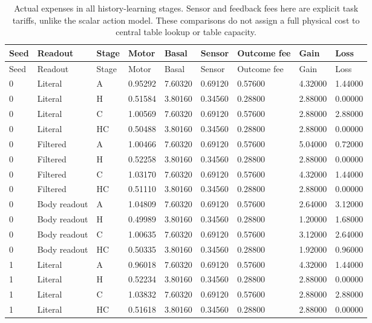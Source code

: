 \begin{longtable}{lllllllll}
\caption{Actual expenses in all history-learning stages. Sensor and feedback fees here are explicit task tariffs, unlike the scalar action model. These comparisons do not assign a full physical cost to central table lookup or table capacity.}\label{tab:history-costs}\\
\toprule
Seed & Readout & Stage & Motor & Basal & Sensor & Outcome fee & Gain & Loss \\
\midrule
\endfirsthead
\toprule
Seed & Readout & Stage & Motor & Basal & Sensor & Outcome fee & Gain & Loss \\
\midrule
\endhead
0 & Literal & A & 0.95292 & 7.60320 & 0.69120 & 0.57600 & 4.32000 & 1.44000 \\
0 & Literal & H & 0.51584 & 3.80160 & 0.34560 & 0.28800 & 2.88000 & 0.00000 \\
0 & Literal & C & 1.00569 & 7.60320 & 0.69120 & 0.57600 & 2.88000 & 2.88000 \\
0 & Literal & HC & 0.50488 & 3.80160 & 0.34560 & 0.28800 & 2.88000 & 0.00000 \\
0 & Filtered & A & 1.00466 & 7.60320 & 0.69120 & 0.57600 & 5.04000 & 0.72000 \\
0 & Filtered & H & 0.52258 & 3.80160 & 0.34560 & 0.28800 & 2.88000 & 0.00000 \\
0 & Filtered & C & 1.03170 & 7.60320 & 0.69120 & 0.57600 & 4.32000 & 1.44000 \\
0 & Filtered & HC & 0.51110 & 3.80160 & 0.34560 & 0.28800 & 2.88000 & 0.00000 \\
0 & Body readout & A & 1.04809 & 7.60320 & 0.69120 & 0.57600 & 2.64000 & 3.12000 \\
0 & Body readout & H & 0.49989 & 3.80160 & 0.34560 & 0.28800 & 1.20000 & 1.68000 \\
0 & Body readout & C & 1.00635 & 7.60320 & 0.69120 & 0.57600 & 3.12000 & 2.64000 \\
0 & Body readout & HC & 0.50335 & 3.80160 & 0.34560 & 0.28800 & 1.92000 & 0.96000 \\
1 & Literal & A & 0.96018 & 7.60320 & 0.69120 & 0.57600 & 4.32000 & 1.44000 \\
1 & Literal & H & 0.52234 & 3.80160 & 0.34560 & 0.28800 & 2.88000 & 0.00000 \\
1 & Literal & C & 1.03832 & 7.60320 & 0.69120 & 0.57600 & 2.88000 & 2.88000 \\
1 & Literal & HC & 0.51618 & 3.80160 & 0.34560 & 0.28800 & 2.88000 & 0.00000 \\

\end{longtable}
